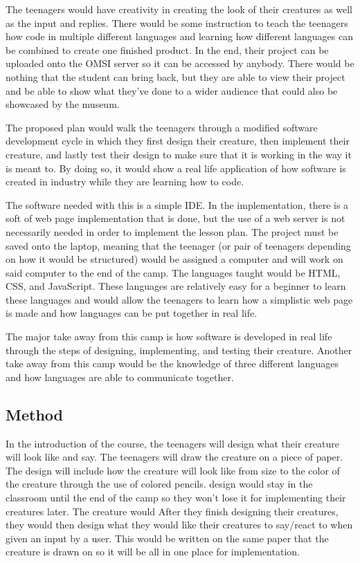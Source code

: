 \documentclass[10pt, letterpaper]{article}
\begin{document}
    The teenagers would have creativity in creating the look of their creatures as well as the input and replies. There would be some instruction to teach the teenagers how code in multiple different languages and learning how different languages can be combined to create one finished product. In the end, their project can be uploaded onto the OMSI server so it can be accessed by anybody. There would be nothing that the student can bring back, but they are able to view their project and be able to show what they've done to a wider audience that could also be showcased by the museum.
    
    The proposed plan would walk the teenagers through a modified software development cycle in which they first design their creature, then implement their creature, and lastly test their design to make sure that it is working in the way it is meant to. By doing so, it would show a real life application of how software is created in industry while they are learning how to code.
    
    The software needed with this is a simple IDE. In the implementation, there is a soft of web page implementation that is done, but the use of a web server is not necessarily needed in order to implement the lesson plan. The project must be saved onto the laptop, meaning that the teenager (or pair of teenagers depending on how it would be structured) would be assigned a computer and will work on said computer to the end of the camp. The languages taught would be HTML, CSS, and JavaScript. These languages are relatively easy for a beginner to learn these languages and would allow the teenagers to learn how a simplistic web page is made and how languages can be put together in real life.
    
    The major take away from this camp is how software is developed in real life through the steps of designing, implementing, and testing their creature. Another take away from this camp would be the knowledge of three different languages and how languages are able to communicate together.
    
\subsection{Method}
    In the introduction of the course, the teenagers will design what their creature will look like and say. The teenagers will draw the creature on a piece of paper. The design will include how the creature will look like from size to the color of the creature through the use of colored pencils. design would stay in the classroom until the end of the camp so they won't lose it for implementing their creatures later. The creature would  After they finish designing their creatures, they would then design what they would like their creatures to say/react to when given an input by a user. This would be written on the same paper that the creature is drawn on so it will be all in one place for implementation.
    
\end{document}
